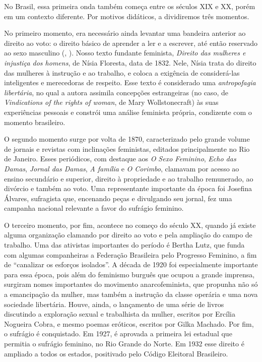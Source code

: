 \documentclass[
	12pt,				%
	openright,			%
	twoside,			%
	a4paper,			%
	english,			%
	brazil				%
	]{abntex2}
\begin{document}
 No Brasil, essa primeira onda também começa entre os séculos XIX e XX, porém em um contexto diferente. Por motivos didáticos, a dividiremos três momentos. 

 No primeiro momento, era necessário ainda levantar uma bandeira anterior ao direito ao voto: o direito básico de aprender a ler e a escrever, até então reservado ao sexo masculino (, \citeyear{duarte2019}). Nosso texto fundante feminista, \textit{Direito das mulheres e injustiça dos homens}, de Nísia Floresta, data de 1832. Nele, Nísia trata do direito das mulheres à instrução e ao trabalho, e coloca a exigência de considerá-las inteligentes e merecedoras de respeito. Esse texto é considerado uma \emph{antropofagia libertária}, no qual a autora assimila concepções estrangeiras (no caso, de \emph{Vindications of the rights of woman}, de Mary Wollstonecraft) às suas experiências pessoais e constrói uma análise feminista própria, condizente com o momento brasileiro.

 O segundo momento surge por volta de 1870, caracterizado pelo grande volume de jornais e revistas com inclinações feministas, editados principalmente no Rio de Janeiro. Esses periódicos, com destaque aos \emph{O Sexo Feminino}, \emph{Echo das Damas}, \emph{Jornal das Damas}, \emph{A família} e \emph{O Corimbo}, clamavam por acesso ao ensino secundário e superior, direito à propriedade e ao trabalho remunerado, ao divórcio e também ao voto. Uma representante importante da época foi Josefina Álvares, sufragista que, encenando peças e divulgando seu jornal, fez uma campanha nacional relevante a favor do sufrágio feminino.
 
 O terceiro momento, por fim, acontece no começo do século XX, quando já existe alguma organização clamando por direito ao voto e pela ampliação do campo de trabalho. Uma das ativistas importantes do período é Bertha Lutz, que funda com algumas companheiras a Federação Brasileira pelo Progresso Feminino, a fim de “canalizar os esforços isolados”. A década de 1920 foi especialmente importante para essa época, pois além do feminismo burguês que ocupou a grande imprensa, surgiram nomes importantes do movimento anarcofeminista, que propunha não só a emancipação da mulher, mas também a instrução da classe operária e uma nova sociedade libertária. Houve, ainda, o lançamento de uma série de livros discutindo a exploração sexual e trabalhista da mulher, escritos por Ercília Nogueira Cobra, e mesmo poemas eróticos, escritos por Gilka Machado. Por fim, o sufrágio é conquistado. Em 1927, é aprovada a primeira lei estadual que permitia o sufrágio feminino, no Rio Grande do Norte. Em 1932 esse direito é ampliado a todos os estados, positivado pelo Código Eleitoral Brasileiro.
 
\end{document}
